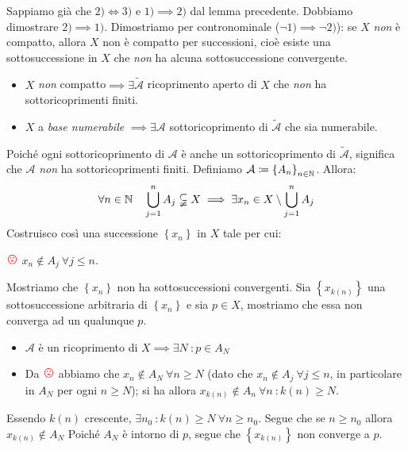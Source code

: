 \begin{demonstration}
Sappiamo già che $2)\iff 3)$ e $1)\implies 2)$ dal lemma precedente. Dobbiamo dimostrare $2)\implies 1)$. Dimostriamo per contronominale ($\neg 1)\implies \neg 2)$): se $X$ \textit{non} è compatto, allora $X$ non è compatto per successioni, cioè esiste una sottosuccessione in $X$ che \textit{non} ha alcuna sottosuccessione convergente.
\begin{itemize}
	\item $X$ \textit{non} compatto$\implies \exists \widetilde{\mathcal{A}}$ ricoprimento aperto di $X$ che \textit{non} ha sottoricoprimenti finiti.
	\item $X$ a \textit{base numerabile} $\implies\exists\mathcal{A}$ sottoricoprimento di $\widetilde{\mathcal{A}}$ che sia numerabile.
\end{itemize}
Poiché ogni sottoricoprimento di $\mathcal{A}$ è anche un sottoricoprimento di $\widetilde{\mathcal{A}}$, significa che $\mathcal{A}$ \textit{non} ha sottoricoprimenti finiti. Definiamo $\mathcal{A}\coloneqq\left\{A_n\right\}_{n\in\mathbb{N}}$.
Allora:
\begin{equation*}
\forall n\in\mathbb{N}\quad \bigcup_{j=1}^n A_j\subsetneqq X\implies \exists x_n\in X\setminus \bigcup_{j=1}^n A_j
\end{equation*}
Costruisco così una successione $\left\{x_n\right\}$ in $X$ tale per cui:
\begin{center}
	$\textcolor{red}{{\large \frownie{}}}$ $x_n\notin A_j\ \forall j\leq n$.
\end{center}
Mostriamo che $\left\{x_n\right\}$ non ha sottosuccessioni convergenti. Sia $\left\{x_{k\left(n\right)}\right\}$ una sottosuccessione arbitraria di $\left\{x_n\right\}$ e sia $p\in X$, mostriamo che essa non converga ad un qualunque $p$.\\
\begin{itemize}
	\item $\mathcal{A}$ è un ricoprimento di $X\implies \exists N\ \colon p\in A_N$
	\item Da $\textcolor{red}{{\large \frownie{}}}$ abbiamo che $x_n \notin A_N \ \forall n\geq N$  (dato che $x_n \notin A_j \ \forall j\leq n$, in particolare in $A_N$ per ogni $n\geq N$); si ha allora $x_{k\left(n\right)}\notin A_n\ \forall n\ \colon k\left(n\right)\geq N$.
\end{itemize}
Essendo $k\left(n\right)$ crescente, $\exists n_0\ \colon k\left(n\right)\geq N\ \forall n\geq n_0$. Segue che se $n\geq n_0$ allora $x_{k\left(n\right)}\notin A_N$
Poiché $A_N$ è intorno di $p$, segue che $\left\{x_{k\left(n\right)}\right\}$ non converge a $p$.
\end{demonstration}
